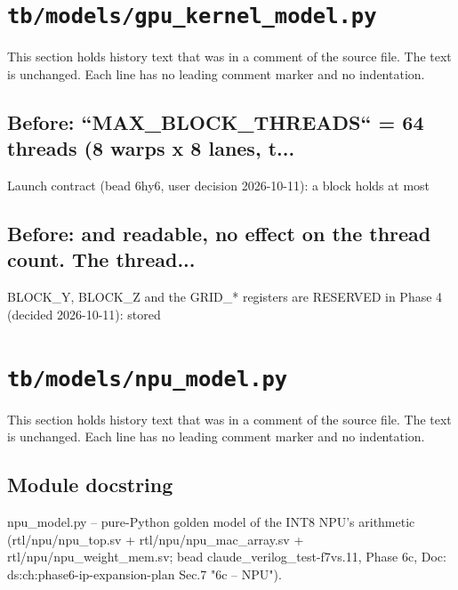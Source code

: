 \section{\texttt{tb/models/gpu\_kernel\_model.py}}\label{cr:suite:gpu-kernel-model}

This section holds history text that was in a comment of the source file. The text is unchanged. Each line has no leading comment marker and no indentation.

\begin{record}

\subsection*{Before: ``MAX\_BLOCK\_THREADS`` = 64 threads (8 warps x 8 lanes, t...}

\begin{textblock}
Launch contract (bead 6hy6, user decision 2026-10-11): a block holds at most
\end{textblock}

\subsection*{Before: and readable, no effect on the thread count.  The thread...}

\begin{textblock}
BLOCK_Y, BLOCK_Z and the GRID_* registers are RESERVED in Phase 4 (decided 2026-10-11): stored
\end{textblock}

\end{record}

\section{\texttt{tb/models/npu\_model.py}}\label{cr:suite:npu-model}

This section holds history text that was in a comment of the source file. The text is unchanged. Each line has no leading comment marker and no indentation.

\begin{record}

\subsection*{Module docstring}

\begin{textblock}
npu_model.py -- pure-Python golden model of the INT8 NPU's arithmetic (rtl/npu/npu_top.sv +
rtl/npu/npu_mac_array.sv + rtl/npu/npu_weight_mem.sv; bead claude_verilog_test-f7vs.11, Phase 6c,
Doc: ds:ch:phase6-ip-expansion-plan Sec.7 "6c -- NPU").
\end{textblock}

\end{record}

